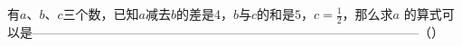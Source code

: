 
有$a$、$b$、$c$三个数，已知$a$减去$b$的差是$4$，$b$与$c$的和是$5$，$c= \frac{1}{2}$，那么求$a$ 的算式可以是--------------------------------------------------------------------------------------------（\hspace{4em}）

